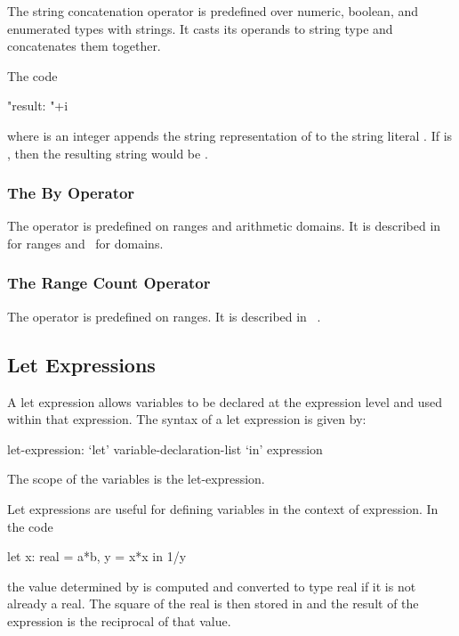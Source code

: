 The string concatenation operator \chpl{+} is predefined over numeric, boolean,
and enumerated types with strings. It casts its operands to string type and
concatenates them together.

\begin{example}
The code
\begin{chapel}
"result: "+i
\end{chapel}
where  is an integer appends the string representation of  to the
string literal .  If  is , then the resulting string
would be .
\end{example}

\subsubsection{The By Operator}
\label{The_By_Operator}

The operator  is predefined on ranges and arithmetic domains.
It is described in~ for ranges
and~ for domains.

\subsubsection{The Range Count Operator}
\label{The_Range_Count_Operator}

The operator \chpl{#} is predefined on ranges. It is described
in ~.

\subsection{Let Expressions}
\label{Let_Expressions}

A let expression allows variables to be declared at the expression
level and used within that expression.  The syntax of a let expression
is given by:
\begin{syntax}
let-expression:
  `let' variable-declaration-list `in' expression
\end{syntax}
The scope of the variables is the let-expression.
\begin{example}
Let expressions are useful for defining variables in the context of
expression.  In the code
\begin{chapel}
  let x: real = a*b, y = x*x in 1/y
\end{chapel}
the value determined by  is computed and converted to type
real if it is not already a real.  The square of the real is then
stored in  and the result of the expression is the reciprocal
of that value.
\end{example}

